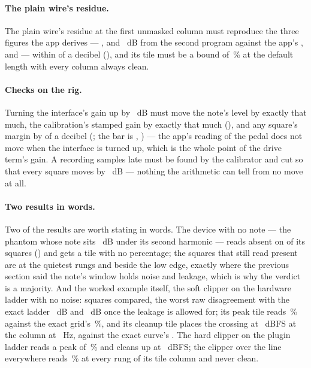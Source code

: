 \documentclass[11pt,a4paper]{article}
\begin{document}
\paragraph{The plain wire's residue.} The
plain wire's residue at the first unmasked column must reproduce the
three figures the app derives --- \jparityResiduePythonTwo{},
\jparityResiduePythonFive{} and \jparityResiduePythonTen{}~dB from the
second program against the app's \jparityResidueLawTwo{},
\jparityResidueLawFive{} and \jparityResidueLawTen{} --- within
\jparityResidueVsLawWords{} of a decibel (\jparityResidueVsLaw{}), and
its tile must be a bound of \jparityIdentityBound{}\,\% at the default
length with every column always clean.

\paragraph{Checks on the rig.} Turning the interface's gain up
by \jparityGainShift{}~dB must move the note's level by exactly that
much, the calibration's stamped gain by exactly that much
(\jparityGainStamp{}), and any square's margin by
\jparityGainMarginMoveWords{} of a decibel (\jparityGainMarginMove{}; the
bar is \jparityGainInvarianceWords{}, \jparityGainInvariance{}) --- the
app's reading of the pedal does not move when the interface is turned
up, which is the whole point of the drive term's gain. A recording
\jparityLatencyFound{} samples late must be found by the calibrator and
cut so that every square moves by \jparityLatencyMove{}~dB --- nothing
the arithmetic can tell from no move at all. \jparityPartBStatus

\paragraph{Two results in words.} Two of the results are worth stating in words. The device with no note
--- the phantom whose note sits \jparityAbsentDepth{}~dB under its second
harmonic --- reads absent on \jparityAbsentFractionWords{} of its squares
(\jparityAbsentFraction{}) and gets a tile with no percentage; the
squares that still read present are at the quietest rungs and beside the
low edge, exactly where the previous section said the note's window
holds noise and leakage, which is why the verdict is a majority. And
the worked example itself, the soft clipper on the hardware ladder with
no noise: \jparityWorkedContent{} squares compared, the worst raw
disagreement with the exact ladder \jparityWorkedRaw{}~dB and
\jparityWorkedResidue{}~dB once the leakage is allowed for; its peak tile
reads \jparityWorkedPeak{}\,\% against the exact grid's
\jparityWorkedTruthPeak{}\,\%, and its cleanup tile places the crossing
at \jparityWorkedCleanup{}~dBFS at the column at
\jparityWorkedCleanupColumnHz{}~Hz, against the exact curve's
\jparityWorkedTruthCleanup{}. The hard clipper on the plugin ladder
reads a peak of \jparityPluginPeak{}\,\% and cleans up at
\jparityPluginCleanup{}~dBFS; the clipper over the line everywhere reads
\jparityNeverCleanPeak{}\,\% at every rung of its tile column and never
clean.
\end{document}
